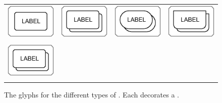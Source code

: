 \begin{figure}[h]
\begin{tabu}{X[c,m]X[c,m]X[c,m]X[c,m]}
    \includegraphics[scale=0.8, valign=m]{images/build/complex_subunit.pdf} & \includegraphics[scale=0.8, valign=m]{images/build/macromolecule_multimer_subunit.pdf} & \includegraphics[scale=0.8, valign=m]{images/build/simple_chemical_multimer_subunit.pdf} & \includegraphics[scale=0.8, valign=m]{images/build/genetic_multimer_subunit.pdf}\\[0.2cm]
     &  &  & \\[0.5cm]
    \includegraphics[scale=0.8, valign=m]{images/build/complex_multimer_subunit.pdf} &  &  & \\[0.2cm]
     & & & \\
\end{tabu}
\caption{The \PD glyphs for the different types of .
Each  decorates a .}
\label{fig:subunit_containers}
\end{figure}
